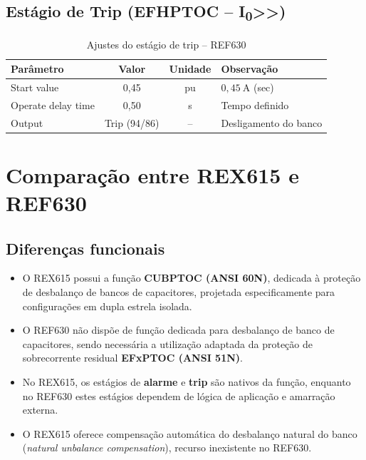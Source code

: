 \documentclass[12pt,a4paper]{article}
\begin{document}
	\subsection*{Estágio de Trip (EFHPTOC -- I\textsubscript{0}>>)}
	
	\begin{table}[H]
		\centering
		\caption{Ajustes do estágio de trip -- REF630}
		\begin{tabular}{>{\raggedright}p{5cm} c c p{5cm}}
			\toprule
			\textbf{Parâmetro} & \textbf{Valor} & \textbf{Unidade} & \textbf{Observação} \\
			\midrule
			Start value & 0{,}45 & pu & $0{,}45\ \si{\ampere}$ (sec) \\
			Operate delay time & 0{,}50 & s & Tempo definido \\
			Output & Trip (94/86) & -- & Desligamento do banco \\
			\bottomrule
		\end{tabular}
	\end{table}
	
	\section{Comparação entre REX615 e REF630}
	
	\subsection*{Diferenças funcionais}
	
	\begin{itemize}
		\item O REX615 possui a função \textbf{CUBPTOC (ANSI 60N)}, dedicada à proteção de desbalanço de bancos de capacitores, projetada especificamente para configurações em dupla estrela isolada.
		\item O REF630 não dispõe de função dedicada para desbalanço de banco de capacitores, sendo necessária a utilização adaptada da proteção de sobrecorrente residual \textbf{EFxPTOC (ANSI 51N)}.
		\item No REX615, os estágios de \textbf{alarme} e \textbf{trip} são nativos da função, enquanto no REF630 estes estágios dependem de lógica de aplicação e amarração externa.
		\item O REX615 oferece compensação automática do desbalanço natural do banco (\textit{natural unbalance compensation}), recurso inexistente no REF630.
	\end{itemize}
	
\end{document}
